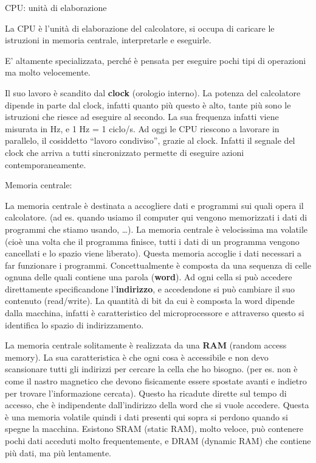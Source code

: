 \documentclass[
  paper=a4,
  oneside  ,captions=tableheading
]{scrbook}
\begin{document}
CPU: unità di elaborazione

La CPU è l'unità di elaborazione del calcolatore, si occupa di caricare
le istruzioni in memoria centrale, interpretarle e eseguirle.

E' altamente specializzata, perché è pensata per eseguire pochi tipi di
operazioni ma molto velocemente.

Il suo lavoro è scandito dal \textbf{clock} (orologio interno). La
potenza del calcolatore dipende in parte dal clock, infatti quanto più
questo è alto, tante più sono le istruzioni che riesce ad eseguire al
secondo. La sua frequenza infatti viene misurata in Hz, e 1 Hz = 1
ciclo/s. Ad oggi le CPU riescono a lavorare in parallelo, il cosiddetto
``lavoro condiviso'', grazie al clock. Infatti il segnale del clock che
arriva a tutti sincronizzato permette di eseguire azioni
contemporaneamente.

Memoria centrale:

La memoria centrale è destinata a accogliere dati e programmi sui quali
opera il calcolatore. (ad es. quando usiamo il computer qui vengono
memorizzati i dati di programmi che stiamo usando, \ldots). La memoria
centrale è velocissima ma volatile (cioè una volta che il programma
finisce, tutti i dati di un programma vengono cancellati e lo spazio
viene liberato). Questa memoria accoglie i dati necessari a far
funzionare i programmi. Concettualmente è composta da una sequenza di
celle ognuna delle quali contiene una parola (\textbf{word}). Ad ogni
cella si può accedere direttamente specificandone l'\textbf{indirizzo},
e accedendone si può cambiare il suo contenuto (read/write). La quantità
di bit da cui è composta la word dipende dalla macchina, infatti è
caratteristico del microprocessore e attraverso questo si identifica lo
spazio di indirizzamento.

La memoria centrale solitamente è realizzata da una \textbf{RAM} (random
access memory). La sua caratteristica è che ogni cosa è accessibile e
non devo scansionare tutti gli indirizzi per cercare la cella che ho
bisogno. (per es. non è come il nastro magnetico che devono fisicamente
essere spostate avanti e indietro per trovare l'informazione cercata).
Questo ha ricadute dirette sul tempo di accesso, che è indipendente
dall'indirizzo della word che si vuole accedere. Questa è una memoria
volatile quindi i dati presenti qui sopra si perdono quando si spegne la
macchina. Esistono SRAM (static RAM), molto veloce, può contenere pochi
dati acceduti molto frequentemente, e DRAM (dynamic RAM) che contiene
più dati, ma più lentamente.
\end{document}
